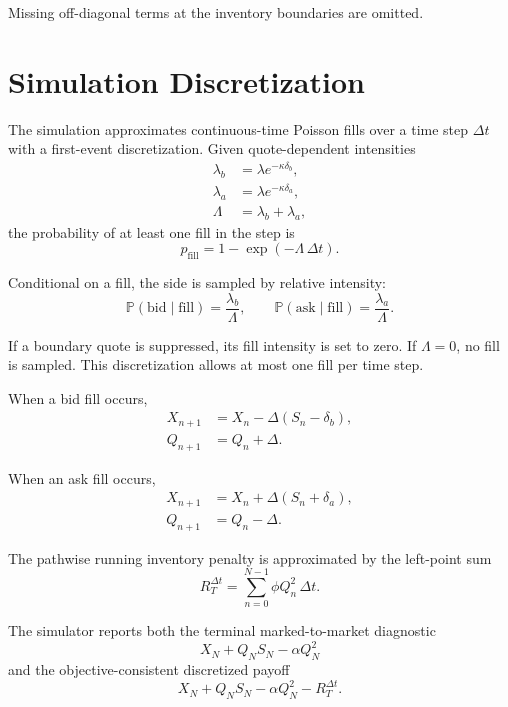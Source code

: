 \documentclass[11pt]{article}
\begin{document}
Missing off-diagonal terms at the inventory boundaries are omitted.

\section{Simulation Discretization}

The simulation approximates continuous-time Poisson fills over a time step $\Delta t$ with a first-event discretization. Given quote-dependent intensities
\begin{align}
\lambda_b &= \lambda e^{-\kappa\delta_b}, \\
\lambda_a &= \lambda e^{-\kappa\delta_a}, \\
\Lambda &= \lambda_b+\lambda_a,
\end{align}
the probability of at least one fill in the step is
\begin{equation}
p_{\mathrm{fill}}=1-\exp(-\Lambda\,\Delta t).
\end{equation}

Conditional on a fill, the side is sampled by relative intensity:
\begin{equation}
\mathbb{P}(\mathrm{bid}\mid\mathrm{fill})=\frac{\lambda_b}{\Lambda},
\qquad
\mathbb{P}(\mathrm{ask}\mid\mathrm{fill})=\frac{\lambda_a}{\Lambda}.
\end{equation}

If a boundary quote is suppressed, its fill intensity is set to zero. If $\Lambda=0$, no fill is sampled. This discretization allows at most one fill per time step.

When a bid fill occurs,
\begin{align}
X_{n+1} &= X_n-\Delta(S_n-\delta_b), \\
Q_{n+1} &= Q_n+\Delta.
\end{align}

When an ask fill occurs,
\begin{align}
X_{n+1} &= X_n+\Delta(S_n+\delta_a), \\
Q_{n+1} &= Q_n-\Delta.
\end{align}

The pathwise running inventory penalty is approximated by the left-point sum
\begin{equation}
R_T^{\Delta t}
= \sum_{n=0}^{N-1}\phi Q_n^2\,\Delta t.
\end{equation}

The simulator reports both the terminal marked-to-market diagnostic
\begin{equation}
X_N+Q_N S_N-\alpha Q_N^2
\end{equation}
and the objective-consistent discretized payoff
\begin{equation}
X_N+Q_N S_N-\alpha Q_N^2-R_T^{\Delta t}.
\end{equation}
\end{document}
